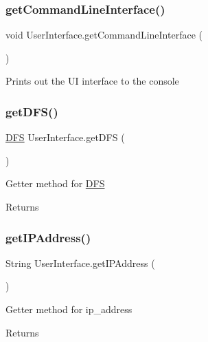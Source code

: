\subsubsection{\texorpdfstring{get\+Command\+Line\+Interface()}{getCommandLineInterface()}}
{\footnotesize\ttfamily void User\+Interface.\+get\+Command\+Line\+Interface (\begin{DoxyParamCaption}{ }\end{DoxyParamCaption})\hspace{0.3cm}{\ttfamily [inline]}}

Prints out the UI interface to the console \mbox{\label{class_user_interface_a6ccb02994e74e468304c7c990d83913a}} 
\subsubsection{\texorpdfstring{get\+D\+F\+S()}{getDFS()}}
{\footnotesize\ttfamily \mbox{\hyperlink{class_d_f_s}{D\+FS}} User\+Interface.\+get\+D\+FS (\begin{DoxyParamCaption}{ }\end{DoxyParamCaption})\hspace{0.3cm}{\ttfamily [inline]}}

Getter method for \mbox{\hyperlink{class_d_f_s}{D\+FS}} \begin{DoxyReturn}{Returns}

\end{DoxyReturn}
\mbox{\label{class_user_interface_a2fda154134eb10db7b184de5a6df5b23}} 
\subsubsection{\texorpdfstring{get\+I\+P\+Address()}{getIPAddress()}}
{\footnotesize\ttfamily String User\+Interface.\+get\+I\+P\+Address (\begin{DoxyParamCaption}{ }\end{DoxyParamCaption})\hspace{0.3cm}{\ttfamily [inline]}}

Getter method for ip\+\_\+address \begin{DoxyReturn}{Returns}

\end{DoxyReturn}
\mbox{\label{class_user_interface_af046587dab904a279c4bde6df3fba567}} 
